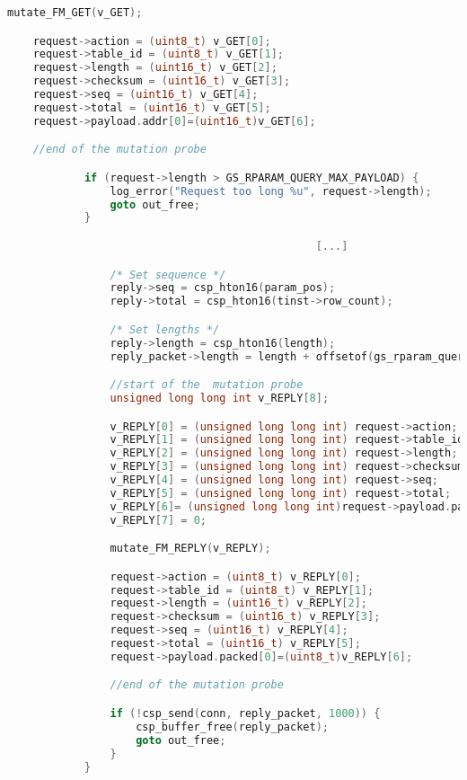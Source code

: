 \begin{lstlisting}[language=c]
    mutate_FM_GET(v_GET);

    request->action = (uint8_t) v_GET[0];
    request->table_id = (uint8_t) v_GET[1];
    request->length = (uint16_t) v_GET[2];
    request->checksum = (uint16_t) v_GET[3];
    request->seq = (uint16_t) v_GET[4];
    request->total = (uint16_t) v_GET[5];
    request->payload.addr[0]=(uint16_t)v_GET[6];

    //end of the mutation probe

            if (request->length > GS_RPARAM_QUERY_MAX_PAYLOAD) {
                log_error("Request too long %u", request->length);
                goto out_free;
            }

          										[...]

                /* Set sequence */
                reply->seq = csp_hton16(param_pos);
                reply->total = csp_hton16(tinst->row_count);

                /* Set lengths */
                reply->length = csp_hton16(length);
                reply_packet->length = length + offsetof(gs_rparam_query_t, payload.packed);

                //start of the  mutation probe
                unsigned long long int v_REPLY[8];

                v_REPLY[0] = (unsigned long long int) request->action;
                v_REPLY[1] = (unsigned long long int) request->table_id;
                v_REPLY[2] = (unsigned long long int) request->length;
                v_REPLY[3] = (unsigned long long int) request->checksum;
                v_REPLY[4] = (unsigned long long int) request->seq;
                v_REPLY[5] = (unsigned long long int) request->total;
                v_REPLY[6]= (unsigned long long int)request->payload.packed[0];
                v_REPLY[7] = 0;

                mutate_FM_REPLY(v_REPLY);

                request->action = (uint8_t) v_REPLY[0];
                request->table_id = (uint8_t) v_REPLY[1];
                request->length = (uint16_t) v_REPLY[2];
                request->checksum = (uint16_t) v_REPLY[3];
                request->seq = (uint16_t) v_REPLY[4];
                request->total = (uint16_t) v_REPLY[5];
                request->payload.packed[0]=(uint8_t)v_REPLY[6];

                //end of the mutation probe

                if (!csp_send(conn, reply_packet, 1000)) {
                    csp_buffer_free(reply_packet);
                    goto out_free;
                }
            }


\end{lstlisting}
